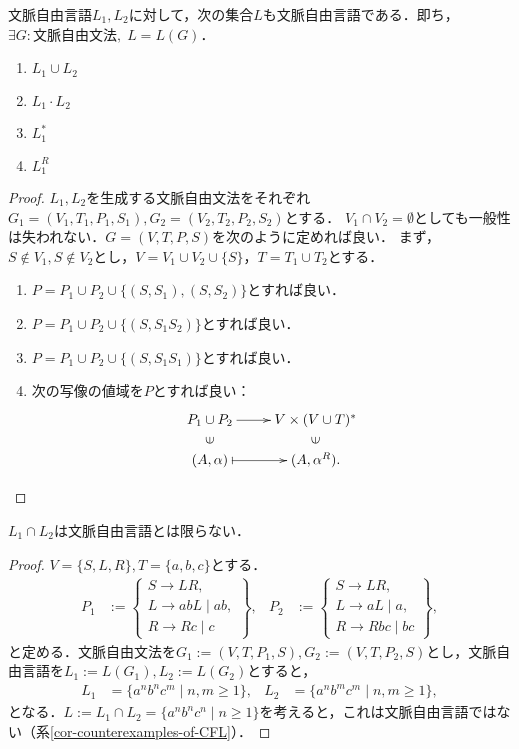 \documentclass[uplatex, dvipdfmx]{jsreport}
\begin{document}
\begin{proposition}[文脈自由言語の閉包属性]\label{prop-closure-properties-of-CFL}
    文脈自由言語$L_1,L_2$に対して，次の集合$L$も文脈自由言語である．即ち，$\exists G:文脈自由文法,\;L=L(G)$．
    \begin{enumerate}
        \item $L_1\cup L_2$
        \item $L_1\cdot L_2$
        \item $L_1^*$
        \item $L_1^R$
    \end{enumerate}
\end{proposition}
\begin{proof}$L_1,L_2$を生成する文脈自由文法をそれぞれ$G_1=(V_1,T_1,P_1,S_1),G_2=(V_2,T_2,P_2,S_2)$とする．
    $V_1\cap V_2=\emptyset$としても一般性は失われない．$G=(V,T,P,S)$を次のように定めれば良い．
    まず，$S\notin V_1,S\notin V_2$とし，$V=V_1\cup V_2\cup\{S\}$，$T=T_1\cup T_2$とする．
    \begin{enumerate}
        \item $P=P_1\cup P_2\cup\{(S,S_1),(S,S_2)\}$とすれば良い．
        \item $P=P_1\cup P_2\cup\{(S,S_1S_2)\}$とすれば良い．
        \item $P=P_1\cup P_2\cup\{(S,S_1S_1)\}$とすれば良い．
        \item 次の写像の値域を$P$とすれば良い：
        \[\xymatrix@R-2pc{
            P_1\cup P_2\ar[r]&V\times (V\cup T)^*\\
            \rotatebox[origin=c]{90}{$\in$}&\rotatebox[origin=c]{90}{$\in$}\\
            (A,\alpha)\ar@{|->}[r]&(A,\alpha^R).
        }\]
    \end{enumerate}
\end{proof}
\begin{proposition}
    $L_1\cap L_2$は文脈自由言語とは限らない．
\end{proposition}
\begin{proof}
    $V=\{S,L,R\},T=\{a,b,c\}$とする．
    \begin{align*}
        P_1&:=\left\{\begin{array}{l}
        S\to LR,\\
        L\to abL\mid ab,\\
        R\to Rc\mid c
        \end{array}\right\},&P_2&:=\left\{\begin{array}{l}
            S\to LR,\\
            L\to aL\mid a,\\
            R\to Rbc\mid bc
            \end{array}\right\},
    \end{align*}
    と定める．文脈自由文法を$G_1:=(V,T,P_1,S),G_2:=(V,T,P_2,S)$とし，文脈自由言語を$L_1:=L(G_1),L_2:=L(G_2)$とすると，
    \begin{align*}
        L_1&=\{a^nb^nc^m\mid n,m\ge 1\},&L_2&=\{a^nb^mc^m\mid n,m\ge 1\},
    \end{align*}
    となる．$L:=L_1\cap L_2=\{a^nb^nc^n\mid n\ge 1\}$を考えると，これは文脈自由言語ではない（系\ref{cor-counterexamples-of-CFL}）．
\end{proof}
\end{document}
